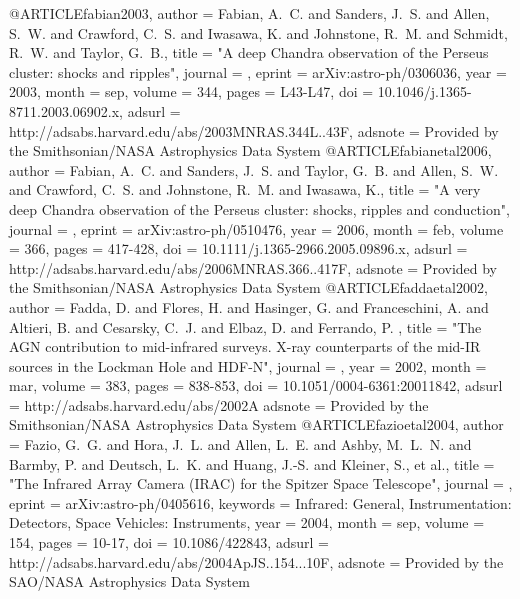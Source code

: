 {{{{{{{{{{{{{{{{{@ARTICLE{fabian2003,
   author = {{Fabian}, A.~C. and {Sanders}, J.~S. and {Allen}, S.~W. and 
	{Crawford}, C.~S. and {Iwasawa}, K. and {Johnstone}, R.~M. and 
	{Schmidt}, R.~W. and {Taylor}, G.~B.},
    title = "{A deep Chandra observation of the Perseus cluster: shocks and ripples}",
  journal = {\mnras},
   eprint = {arXiv:astro-ph/0306036},
     year = 2003,
    month = sep,
   volume = 344,
    pages = {L43-L47},
      doi = {10.1046/j.1365-8711.2003.06902.x},
   adsurl = {http://adsabs.harvard.edu/abs/2003MNRAS.344L..43F},
  adsnote = {Provided by the Smithsonian/NASA Astrophysics Data System}
}
@ARTICLE{fabianetal2006,
   author = {{Fabian}, A.~C. and {Sanders}, J.~S. and {Taylor}, G.~B. and 
	{Allen}, S.~W. and {Crawford}, C.~S. and {Johnstone}, R.~M. and 
	{Iwasawa}, K.},
    title = "{A very deep Chandra observation of the Perseus cluster: shocks, ripples and conduction}",
  journal = {\mnras},
   eprint = {arXiv:astro-ph/0510476},
     year = 2006,
    month = feb,
   volume = 366,
    pages = {417-428},
      doi = {10.1111/j.1365-2966.2005.09896.x},
   adsurl = {http://adsabs.harvard.edu/abs/2006MNRAS.366..417F},
  adsnote = {Provided by the Smithsonian/NASA Astrophysics Data System}
}
@ARTICLE{faddaetal2002,
   author = {{Fadda}, D. and {Flores}, H. and {Hasinger}, G. and {Franceschini}, A. and 
	{Altieri}, B. and {Cesarsky}, C.~J. and {Elbaz}, D. and {Ferrando}, P.
	},
    title = "{The AGN contribution to mid-infrared surveys. X-ray counterparts of the mid-IR sources in the Lockman Hole and HDF-N}",
  journal = {\aap},
     year = 2002,
    month = mar,
   volume = 383,
    pages = {838-853},
      doi = {10.1051/0004-6361:20011842},
   adsurl = {http://adsabs.harvard.edu/abs/2002A%
  adsnote = {Provided by the Smithsonian/NASA Astrophysics Data System}
}
@ARTICLE{fazioetal2004,
   author = {{Fazio}, G.~G. and {Hora}, J.~L. and {Allen}, L.~E. and {Ashby}, M.~L.~N. and 
	{Barmby}, P. and {Deutsch}, L.~K. and {Huang}, J.-S. and {Kleiner}, S., et al.},
    title = "{The Infrared Array Camera (IRAC) for the Spitzer Space Telescope}",
  journal = {\apjs},
   eprint = {arXiv:astro-ph/0405616},
 keywords = {Infrared: General, Instrumentation: Detectors, Space Vehicles: Instruments},
     year = 2004,
    month = sep,
   volume = 154,
    pages = {10-17},
      doi = {10.1086/422843},
   adsurl = {http://adsabs.harvard.edu/abs/2004ApJS..154...10F},
  adsnote = {Provided by the SAO/NASA Astrophysics Data System}
}
}}}}}}}}}}}}}}}}}}
